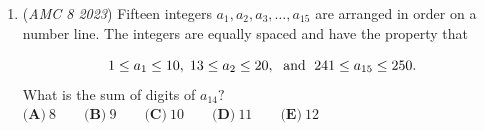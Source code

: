 \begin{enumerate}
$\textbf{(A)}\ 14.6 \qquad \textbf{(B)}\ 14.8 \qquad \textbf{(C)}\ 15 \qquad \textbf{(D)}\ 15.2 \qquad \textbf{(E)}\ 15.4$


	\item (\textit{AMC 8 2023}) Fifteen integers $a_1, a_2, a_3, \dots, a_{15}$ are arranged in order on a number line. The integers are equally spaced and have the property that

 \[1 \le a_1 \le 10, \thickspace 13 \le a_2 \le 20, \thickspace \text{ and } \thickspace 241 \le a_{15}\le 250.\]
What is the sum of digits of $a_{14}?$
$\textbf{(A)}\ 8 \qquad \textbf{(B)}\ 9 \qquad \textbf{(C)}\ 10 \qquad \textbf{(D)}\ 11 \qquad \textbf{(E)}\ 12$


\end{enumerate}